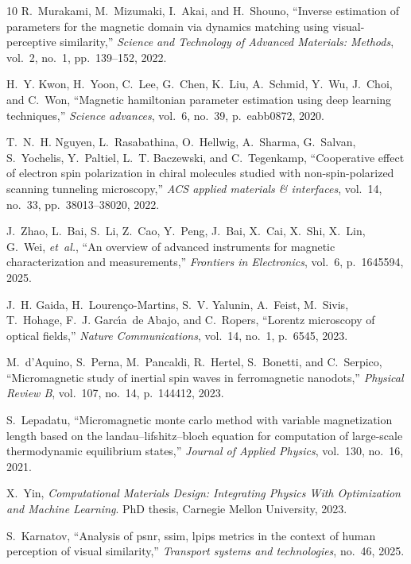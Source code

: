 \documentclass[final,5p,times,twocolumn]{elsarticle}
\begin{document}
\begin{thebibliography}{10}
R.~Murakami, M.~Mizumaki, I.~Akai, and H.~Shouno, ``Inverse estimation of parameters for the magnetic domain via dynamics matching using visual-perceptive similarity,'' {\em Science and Technology of Advanced Materials: Methods}, vol.~2, no.~1, pp.~139--152, 2022.

H.~Y. Kwon, H.~Yoon, C.~Lee, G.~Chen, K.~Liu, A.~Schmid, Y.~Wu, J.~Choi, and C.~Won, ``Magnetic hamiltonian parameter estimation using deep learning techniques,'' {\em Science advances}, vol.~6, no.~39, p.~eabb0872, 2020.

T.~N.~H. Nguyen, L.~Rasabathina, O.~Hellwig, A.~Sharma, G.~Salvan, S.~Yochelis, Y.~Paltiel, L.~T. Baczewski, and C.~Tegenkamp, ``Cooperative effect of electron spin polarization in chiral molecules studied with non-spin-polarized scanning tunneling microscopy,'' {\em ACS applied materials \& interfaces}, vol.~14, no.~33, pp.~38013--38020, 2022.

J.~Zhao, L.~Bai, S.~Li, Z.~Cao, Y.~Peng, J.~Bai, X.~Cai, X.~Shi, X.~Lin, G.~Wei, {\em et~al.}, ``An overview of advanced instruments for magnetic characterization and measurements,'' {\em Frontiers in Electronics}, vol.~6, p.~1645594, 2025.

J.~H. Gaida, H.~Louren{\c{c}}o-Martins, S.~V. Yalunin, A.~Feist, M.~Sivis, T.~Hohage, F.~J. Garc{\'\i}a~de Abajo, and C.~Ropers, ``Lorentz microscopy of optical fields,'' {\em Nature Communications}, vol.~14, no.~1, p.~6545, 2023.

M.~d'Aquino, S.~Perna, M.~Pancaldi, R.~Hertel, S.~Bonetti, and C.~Serpico, ``Micromagnetic study of inertial spin waves in ferromagnetic nanodots,'' {\em Physical Review B}, vol.~107, no.~14, p.~144412, 2023.

S.~Lepadatu, ``Micromagnetic monte carlo method with variable magnetization length based on the landau--lifshitz--bloch equation for computation of large-scale thermodynamic equilibrium states,'' {\em Journal of Applied Physics}, vol.~130, no.~16, 2021.

X.~Yin, {\em Computational Materials Design: Integrating Physics With Optimization and Machine Learning}.
\newblock PhD thesis, Carnegie Mellon University, 2023.

S.~Karnatov, ``Analysis of psnr, ssim, lpips metrics in the context of human perception of visual similarity,'' {\em Transport systems and technologies}, no.~46, 2025.


\end{thebibliography}
\end{document}
